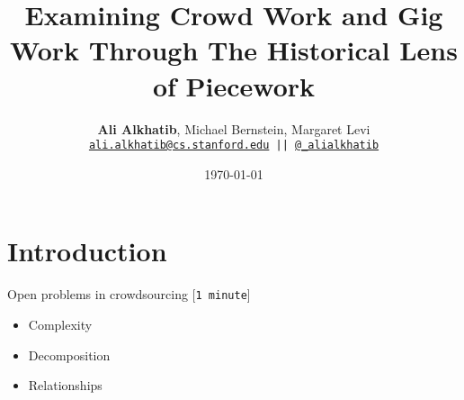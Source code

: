 \documentclass{beamer}
\title{Examining Crowd Work and Gig Work Through The Historical Lens of Piecework}
\author{\textbf{Ali Alkhatib},
                Michael Bernstein,
                Margaret Levi\\
\texttt{ \scriptsize{\href{mailto:ali.alkhatib@cs.stanford.edu}{ali.alkhatib@cs.stanford.edu} ||
         \href{http://twitter.com/_alialkhatib}{@\_alialkhatib}} }}
\institute[Stanford]{Stanford University}
\date{\today}
\begin{document}
\begin{frame}
\titlepage
\end{frame}





\section{Introduction}

\begin{frame}{Open problems in crowdsourcing
                                                                                [\texttt{1 minute}]
}
\begin{itemize}[<+- | alert@+>]
  \item Complexity~\cite{suzukiAtelier,KimStoria,yuanAlmost,
                         YuEncouragingOutside,
                         Nebeling:2016:WCW:2858036.2858169,
                         Hahn:2016:KAB:2858036.2858364}
  \item Decomposition~\cite{sensitiveTasks,LykourentzouPersonalityMatters,
                            Law:2016:CKC:2858036.2858144,
                            Chang:2016:ACC:2858036.2858411,
                            Newell:2016:OMA:2858036.2858490}
  \item Relationships~\cite{turkopticon,storiesIraniSilberman,crowdcollab,
                            takingAHITMcInnis}
\end{itemize}
\end{frame}
\end{document}
